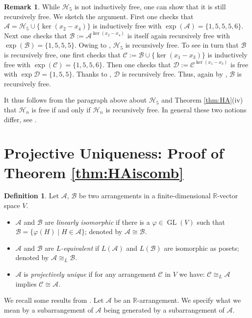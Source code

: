 \documentclass[12pt]{amsart}
\newcommand\CA{{\mathscr A}}
\newcommand\CB{{\mathscr B}}
\newcommand\CC{{\mathscr C}}
\renewcommand\CD{{\mathscr D}}
\newcommand\CH{{\mathscr H}}
\newcommand\BBR{{\mathbb R}}
\newcommand\GL{\operatorname{GL}}
\numberwithin{equation}{section}
\theoremstyle{plain}
\theoremstyle{definition}
\newtheorem{defn}[equation]{Definition}
\newtheorem{remark}[equation]{Remark}
\begin{document}
\begin{remark}
	\label{rem:h5recfree}
	While $\CH_5$ is not inductively free, one can show that it is still recursively free. We sketch the argument. 
	First one checks that $\CA = \CH_5 \cup \{\ker(x_2 - x_4)\}$ is inductively free  with $\exp(\CA) = \{1,5,5,5,6\}$. Next one checks that $\CB := \CA^{\ker(x_2 - x_4)}$ is itself again recursively free with $\exp(\CB) = \{1,5,5,5\}$. Owing to \cite[Def.~4.60]{orlikterao:arrangements}, $\CH_5$ is recursively free.
	To see in turn that $\CB$ is recursively free, one first checks that  $\CC := \CB \cup \{\ker(x_1 - x_3)\}$ is inductively free with $\exp(\CC) = \{1,5,5,6\}$. Then one checks that 
	$\CD := \CC^{\ker(x_1 - x_3)}$ is free with $\exp \CD = \{1,5,5\}$. Thanks to  \cite[Thm.~1.1]{abeetall:free}, $\CD$ is recursively free. Thus, again by  \cite[Def.~4.60]{orlikterao:arrangements},  $\CB$ is recursively free.
	
	It thus follows from the paragraph above about $\CH_5$ and Theorem \ref{thm:HA}(iv) that $\CH_n$ is free if and only if $\CH_n$ is  recursively free. In general these two notions differ, see \cite{cuntzhoge}.  
\end{remark}


\section{Projective Uniqueness: Proof of Theorem \ref{thm:HAiscomb}}
\label{s:thm:HAiscomb}

\begin{defn}
	\label{def:projunique}
	Let $\CA$, $\CB$ be two arrangements in a finite-dimensional $\BBR$-vector space $V$.
	\begin{itemize}
		\item[(i)] $\CA$ and $\CB$ are \emph{linearly isomorphic} if there is a $\varphi \in \GL(V)$
		such that $\CB =  \{\varphi(H) \mid H \in \CA\}$; denoted by $\CA \cong \CB$.
		\item[(ii)] $\CA$ and $\CB$ are \emph{$L$-equivalent} if $L(\CA)$ and $L(\CB)$ are isomorphic as posets;
		denoted by $\CA \cong_L \CB$.
		\item[(iii)] $\CA$ is \emph{projectively unique} if for any arrangement $\CC$ in $V$ we have:
		$\CC \cong_L \CA$ implies $\CC \cong \CA$.
	\end{itemize}
\end{defn}

We recall some results from \cite{GMMR}.
Let $\CA$ be an $\BBR$-arrangement.
We specify what we mean by a subarrangement of $\CA$ being generated by a subarrangement of $\CA$. 
\end{document}
